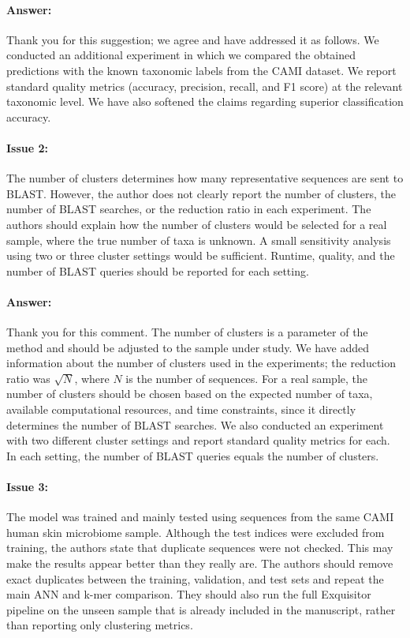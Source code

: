 \documentclass{article}
\begin{document}
\paragraph{Answer:}
Thank you for this suggestion; we agree and have addressed it as follows. 
We conducted an additional experiment in which we compared the obtained predictions with the known taxonomic labels from the CAMI dataset. 
We report standard quality metrics (accuracy, precision, recall, and F1 score) at the relevant taxonomic level. 
We have also softened the claims regarding superior classification accuracy.


\paragraph{Issue 2:}
\begin{displayquote}
The number of clusters determines how many representative sequences are sent to BLAST. However, the author does not clearly report the number of clusters, the number of BLAST searches, or the reduction ratio in each experiment. The authors should explain how the number of clusters would be selected for a real sample, where the true number of taxa is unknown. A small sensitivity analysis using two or three cluster settings would be sufficient. Runtime, quality, and the number of BLAST queries should be reported for each setting.
\end{displayquote}

\paragraph{Answer:}
Thank you for this comment. 
The number of clusters is a parameter of the method and should be adjusted to the sample under study. 
We have added information about the number of clusters used in the experiments; the reduction ratio was $\sqrt{N}$, where $N$ is the number of sequences. 
For a real sample, the number of clusters should be chosen based on the expected number of taxa, available computational resources, and time constraints, since it directly determines the number of BLAST searches.
We also conducted an experiment with two different cluster settings and report standard quality metrics for each. 
In each setting, the number of BLAST queries equals the number of clusters.


\paragraph{Issue 3:}
\begin{displayquote}
The model was trained and mainly tested using sequences from the same CAMI human skin microbiome sample. Although the test indices were excluded from training, the authors state that duplicate sequences were not checked. This may make the results appear better than they really are. The authors should remove exact duplicates between the training, validation, and test sets and repeat the main ANN and k-mer comparison. They should also run the full Exquisitor pipeline on the unseen sample that is already included in the manuscript, rather than reporting only clustering metrics.
\end{displayquote}
\end{document}
